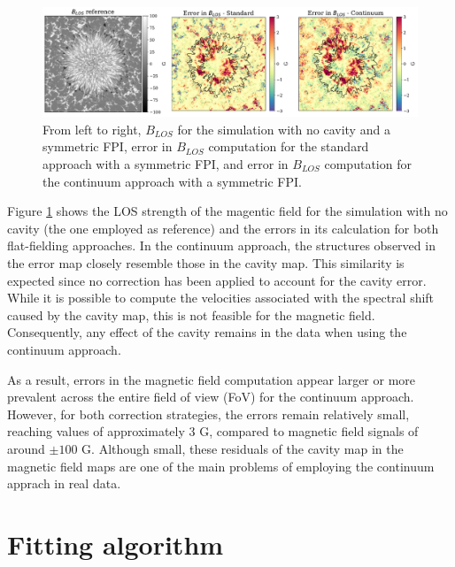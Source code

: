\begin{figure}
  \includegraphics[width=\textwidth]{figures/Mancha/blos_errors.pdf}
  \caption{
    From left to right, $B_{LOS}$ for the simulation with no cavity and a symmetric FPI, error in $B_{LOS}$ computation for the standard approach with a symmetric FPI, and error in $B_{LOS}$ computation for the continuum approach with a symmetric FPI. 
    \label{fig_mancha: blos_errors}}
\end{figure}

Figure \ref{fig_mancha: blos_errors} shows the LOS strength of the magentic field for the simulation with no cavity (the one employed as reference) and the errors in its calculation for both flat-fielding approaches.  In the continuum approach, the structures observed in the error map closely resemble those in the cavity map. This similarity is expected since no correction has been applied to account for the cavity error. While it is possible to compute the velocities associated with the spectral shift caused by the cavity map, this is not feasible for the magnetic field. Consequently, any effect of the cavity remains in the data when using the continuum approach.

As a result, errors in the magnetic field computation appear larger or more prevalent across the entire field of view (FoV) for the continuum approach. However, for both correction strategies, the errors remain relatively small, reaching values of approximately 3 G, compared to magnetic field signals of around $\pm 100$ G. Although small, these residuals of the cavity map in the magnetic field maps are one of the main problems of employing the continuum apprach in real data.

\section{\label{sect: etalon_corr_fitting}Fitting algorithm}

